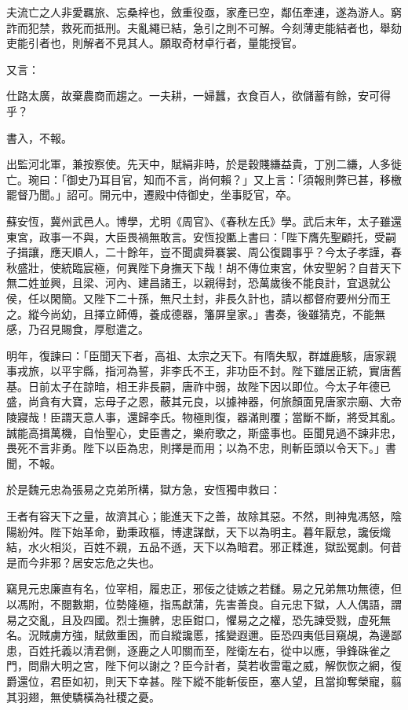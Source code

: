 \begin{pinyinscope}
 夫流亡之人非愛羈旅、忘桑梓也，斂重役亟，家產已空，鄰伍牽連，遂為游人。窮詐而犯禁，救死而抵刑。夫亂繩已結，急引之則不可解。今刻薄吏能結者也，舉劾吏能引者也，則解者不見其人。願取奇材卓行者，量能授官。



 又言：



 仕路太廣，故棄農商而趨之。一夫耕，一婦蠶，衣食百人，欲儲蓄有餘，安可得乎？



 書入，不報。



 出監河北軍，兼按察使。先天中，賦絹非時，於是穀賤縑益貴，丁別二縑，人多徙亡。琬曰：「御史乃耳目官，知而不言，尚何賴？」又上言：「須報則弊已甚，移檄罷督乃聞。」詔可。開元中，遷殿中侍御史，坐事貶官，卒。



 蘇安恆，冀州武邑人。博學，尤明《周官》、《春秋左氏》學。武后末年，太子雖還東宮，政事一不與，大臣畏禍無敢言。安恆投匭上書曰：「陛下膺先聖顧托，受嗣子揖讓，應天順人，二十餘年，豈不聞虞舜褰裳、周公復闢事乎？今太子孝謹，春秋盛壯，使統臨宸極，何異陛下身撫天下哉！胡不傳位東宮，休安聖躬？自昔天下無二姓並興，且梁、河內、建昌諸王，以親得封，恐萬歲後不能良計，宜退就公侯，任以閑簡。又陛下二十孫，無尺土封，非長久計也，請以都督府要州分而王之。縱今尚幼，且擇立師傅，養成德器，籓屏皇家。」書奏，後雖猜克，不能無感，乃召見賜食，厚慰遣之。



 明年，復諫曰：「臣聞天下者，高祖、太宗之天下。有隋失馭，群雄鹿駭，唐家親事戎旅，以平宇縣，指河為誓，非李氏不王，非功臣不封。陛下雖居正統，實唐舊基。日前太子在諒暗，相王非長嗣，唐祚中弱，故陛下因以即位。今太子年德已盛，尚貪有大寶，忘母子之恩，蔽其元良，以據神器，何旅顏面見唐家宗廟、大帝陵寢哉！臣謂天意人事，還歸李氏。物極則復，器滿則覆；當斷不斷，將受其亂。誠能高揖萬機，自怡聖心，史臣書之，樂府歌之，斯盛事也。臣聞見過不諫非忠，畏死不言非勇。陛下以臣為忠，則擇是而用；以為不忠，則斬臣頭以令天下。」書聞，不報。



 於是魏元忠為張易之克弟所構，獄方急，安恆獨申救曰：



 王者有容天下之量，故濟其心；能進天下之善，故除其惡。不然，則神鬼馮怒，陰陽紛舛。陛下始革命，勤秉政樞，博逮謀猷，天下以為明主。暮年厭怠，讒佞熾結，水火相災，百姓不親，五品不遜，天下以為暗君。邪正糅進，獄訟冤劇。何昔是而今非邪？居安忘危之失也。



 竊見元忠廉直有名，位宰相，履忠正，邪佞之徒嫉之若讎。易之兄弟無功無德，但以馮附，不閱數期，位勢隆極，指馬獻蒲，先害善良。自元忠下獄，人人偶語，謂易之交亂，且及四國。烈士撫髀，忠臣鉗口，懼易之之權，恐先諫受戮，虛死無名。況賊虜方強，賦斂重困，而自縱讒慝，搖變遐邇。臣恐四夷低目窺覘，為邊鄙患，百姓托義以清君側，逐鹿之人叩關而至，陛衛左右，從中以應，爭鋒硃雀之門，問鼎大明之宮，陛下何以謝之？臣今計者，莫若收雷電之威，解恢恢之網，復爵還位，君臣如初，則天下幸甚。陛下縱不能斬佞臣，塞人望，且當抑奪榮寵，翦其羽翅，無使驕橫為社稷之憂。




\end{pinyinscope}
